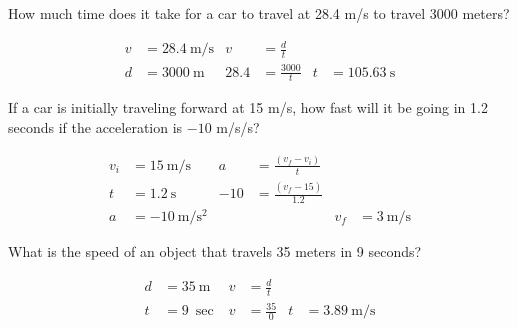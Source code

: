 \documentclass[10pt]{exam}
\begin{document}
\begin{questions}

  \newcommand{\ansblank}{
    \ifprintanswers
    \else
      \ku
    \fi
    \vs
  }

  \question
    How much time does it take for a car to travel at 28.4 m/s to travel 3000 meters? 
    \begin{solution}
      \begin{align*}
        v &= \SI{28.4}{\meter\per\second} 
                            & v &= \frac{d}{t} \\
        d &= \SI{3000}{\meter}
                            & 28.4 &= \frac{3000}{t} &
                              t &= \SI{105.63}{\second}
      \end{align*}
    \end{solution}
    \ansblank

  
  \question
    If a car is initially traveling forward at 15 m/s, how fast will it be going in 1.2 seconds if the acceleration is $-10$ m/s/s?
    \begin{solution}
      \begin{align*}
        v_i &= \SI{15}{\meter\per\second} & 
                a &= \frac{\left(v_f-v_i\right)}{t}  \\
        t &= \SI{1.2}{\second} &
              -10 &= \frac{\left(v_f-15\right)}{1.2} \\
        a &= \SI{-10}{\meter\per\second^2} &&&
                      v_f &= \SI{3}{\meter\per\second}
      \end{align*}
    \end{solution}
    \ansblank
  
  
  \pagebreak
  
  \question
    What is the speed of an object that travels 35 meters in 9 seconds? 
    \begin{solution}
      \begin{align*}
        d &= \SI{35}{\meter} 
                            & v &= \frac{d}{t} \\
        t &= \SI{9}{\sec}
                            & v &= \frac{35}{0} &
                       t &= \SI{3.89}{\meter\per\second}
      \end{align*}
    \end{solution}
    \ansblank
        

\end{questions}
\end{document}
